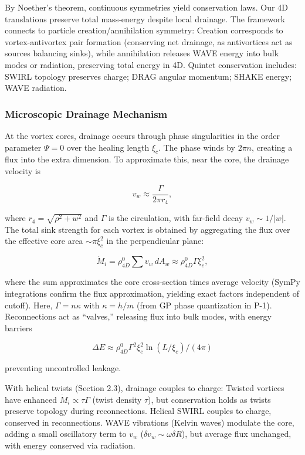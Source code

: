 By Noether's theorem, continuous symmetries yield conservation laws. Our 4D translations preserve total mass-energy despite local drainage. The framework connects to particle creation/annihilation symmetry: Creation corresponds to vortex-antivortex pair formation (conserving net drainage, as antivortices act as sources balancing sinks), while annihilation releases WAVE energy into bulk modes or radiation, preserving total energy in 4D. Quintet conservation includes: SWIRL topology preserves charge; DRAG angular momentum; SHAKE energy; WAVE radiation.

\subsubsection{Microscopic Drainage Mechanism}
At the vortex cores, drainage occurs through phase singularities in the order parameter $\Psi=0$ over the healing length $\xi_c$. The phase winds by $2\pi n$, creating a flux into the extra dimension. To approximate this, near the core, the drainage velocity is

\begin{equation}
v_w \approx \frac{\Gamma}{2\pi r_4},
\end{equation}

where $r_4 = \sqrt{\rho^2 + w^2}$ and $\Gamma$ is the circulation, with far-field decay $v_w \sim 1/|w|$. The total sink strength for each vortex is obtained by aggregating the flux over the effective core area $\sim \pi \xi_c^2$ in the perpendicular plane:

\begin{equation}
\dot{M}_i = \rho_{4D}^0 \sum v_w \, dA_w \approx \rho_{4D}^0 \Gamma \xi_c^2,
\end{equation}

where the sum approximates the core cross-section times average velocity (SymPy integrations confirm the flux approximation, yielding exact factors independent of cutoff). Here, $\Gamma = n \kappa$ with $\kappa = h / m$ (from GP phase quantization in P-1). Reconnections act as ``valves,'' releasing flux into bulk modes, with energy barriers

\begin{equation}
\Delta E \approx \rho_{4D}^0 \Gamma^2 \xi_c^2 \ln(L / \xi_c) / (4\pi)
\end{equation}

preventing uncontrolled leakage.

With helical twists (Section 2.3), drainage couples to charge: Twisted vortices have enhanced $\dot{M}_i \propto \tau \Gamma$ (twist density $\tau$), but conservation holds as twists preserve topology during reconnections. Helical SWIRL couples to charge, conserved in reconnections. WAVE vibrations (Kelvin waves) modulate the core, adding a small oscillatory term to $v_w$ ($\delta v_w \sim \omega \delta R$), but average flux unchanged, with energy conserved via radiation.


